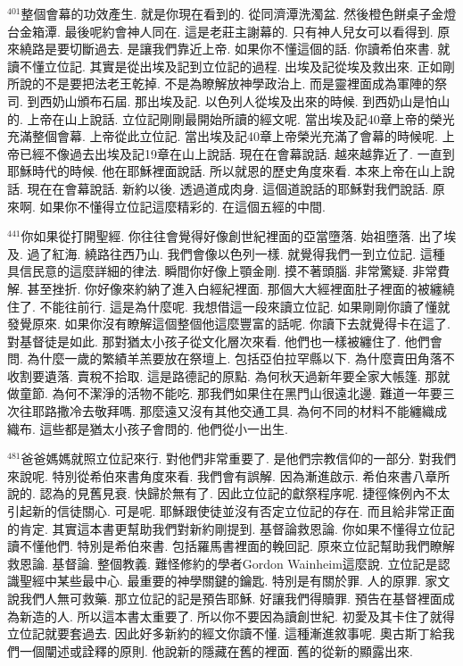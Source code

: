 \documentclass{book}
\begin{document}
$^{401}$整個會幕的功效產生.
就是你現在看到的.
從同濟潭洗濁盆.
然後橙色餅桌子金燈台金箱潭.
最後呢約會神人同在.
這是老莊主謝幕的.
只有神人兒女可以看得到.
原來繞路是要切斷過去.
是讓我們靠近上帝.
如果你不懂這個的話.
你讀希伯來書.
就讀不懂立位記.
其實是從出埃及記到立位記的過程.
出埃及記從埃及救出來.
正如剛所說的不是要把法老王乾掉.
不是為瞭解放神學政治上.
而是靈裡面成為軍陣的祭司.
到西奶山頒布石屆.
那出埃及記.
以色列人從埃及出來的時候.
到西奶山是怕山的.
上帝在山上說話.
立位記剛剛最開始所讀的經文呢.
當出埃及記40章上帝的榮光充滿整個會幕.
上帝從此立位記.
當出埃及記40章上帝榮光充滿了會幕的時候呢.
上帝已經不像過去出埃及記19章在山上說話.
現在在會幕說話.
越來越靠近了.
一直到耶穌時代的時候.
他在耶穌裡面說話.
所以就恩的歷史角度來看.
本來上帝在山上說話.
現在在會幕說話.
新約以後.
透過道成肉身.
這個道說話的耶穌對我們說話.
原來啊.
如果你不懂得立位記這麼精彩的.
在這個五經的中間.

$^{441}$你如果從打開聖經.
你往往會覺得好像創世紀裡面的亞當墮落.
始祖墮落.
出了埃及.
過了紅海.
繞路往西乃山.
我們會像以色列一樣.
就覺得我們一到立位記.
這種具信民意的這麼詳細的律法.
瞬間你好像上顎金剛.
摸不著頭腦.
非常驚疑.
非常費解.
甚至挫折.
你好像來約納了進入白經紀裡面.
那個大大經裡面肚子裡面的被纏繞住了.
不能往前行.
這是為什麼呢.
我想借這一段來讀立位記.
如果剛剛你讀了懂就發覺原來.
如果你沒有瞭解這個整個他這麼豐富的話呢.
你讀下去就覺得卡在這了.
對基督徒是如此.
那對猶太小孩子從文化層次來看.
他們也一樣被纏住了.
他們會問.
為什麼一歲的繁績羊羔要放在祭壇上.
包括亞伯拉罕縣以下.
為什麼賣田角落不收割要遺落.
賣稅不拾取.
這是路德記的原點.
為何秋天過新年要全家大帳篷.
那就做童節.
為何不潔淨的活物不能吃.
那我們如果住在黑門山很遠北邊.
難道一年要三次往耶路撒冷去敬拜嗎.
那麼遠又沒有其他交通工具.
為何不同的材料不能纏織成織布.
這些都是猶太小孩子會問的.
他們從小一出生.

$^{481}$爸爸媽媽就照立位記來行.
對他們非常重要了.
是他們宗教信仰的一部分.
對我們來說呢.
特別從希伯來書角度來看.
我們會有誤解.
因為漸進啟示.
希伯來書八章所說的.
認為的見舊見衰.
快歸於無有了.
因此立位記的獻祭程序呢.
捷徑條例內不太引起新的信徒關心.
可是呢.
耶穌跟使徒並沒有否定立位記的存在.
而且給非常正面的肯定.
其實這本書更幫助我們對新約剛提到.
基督論救恩論.
你如果不懂得立位記讀不懂他們.
特別是希伯來書.
包括羅馬書裡面的輓回記.
原來立位記幫助我們瞭解救恩論.
基督論.
整個教義.
難怪修約的學者Gordon Wainheim這麼說.
立位記是認識聖經中某些最中心.
最重要的神學關鍵的鑰匙.
特別是有關於罪.
人的原罪.
家文說我們人無可救藥.
那立位記的記是預告耶穌.
好讓我們得贖罪.
預告在基督裡面成為新造的人.
所以這本書太重要了.
所以你不要因為讀創世紀.
初愛及其卡住了就得立位記就要套過去.
因此好多新約的經文你讀不懂.
這種漸進敘事呢.
奧古斯丁給我們一個闡述或詮釋的原則.
他說新的隱藏在舊的裡面.
舊的從新的顯露出來.
\end{document}
